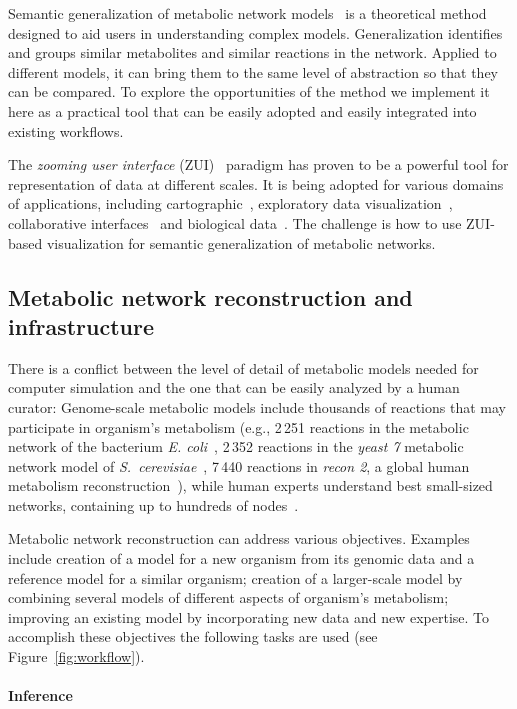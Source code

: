 \documentclass{bmcart}
\begin{document}
Semantic generalization of metabolic network models~\cite{Zhukova2014} is a theoretical method designed to aid users in understanding complex models. Generalization identifies and groups similar metabolites and similar reactions in the network.
Applied to different models, it can bring them to the same level of abstraction so that they can be compared.
To explore the opportunities of the method we implement it here as a practical tool that
can be easily adopted and easily integrated into existing workflows.

The \emph{zooming user interface} (ZUI)~\cite{Bederson1998} paradigm has proven to be a powerful tool for representation of data at different scales. It is being adopted for various domains of applications, including cartographic~\cite{Nivala2008}, exploratory data visualization~\cite{Roberts2005}, collaborative interfaces~\cite{Laufer2011} and biological data~\cite{Pook1998, Hu2007}. The challenge is how to use ZUI-based visualization for semantic generalization of metabolic networks.

\subsection*{Metabolic network reconstruction and infrastructure}
There is a conflict between the level of detail of metabolic models needed for computer simulation and the one that can be easily analyzed by a human curator: Genome-scale metabolic models include thousands of reactions that may participate in organism's metabolism (e.g.,  2\,251 reactions in the metabolic network of the bacterium \emph{E. coli}~\cite{Orth2011}, 2\,352 reactions in the \emph{yeast 7} metabolic network model of \emph{S.~cerevisiae}~\cite{Aung2013}, 7\,440 reactions in \emph{recon 2},  a global human metabolism reconstruction~\cite{Thiele2013}), while human experts understand best small-sized networks, containing up to hundreds of nodes~\cite{VonLandesberger2011,Herman2000}.

Metabolic network reconstruction can address various objectives. Examples include creation of a model for a new organism from its genomic data and a reference model for a similar organism; creation of a larger-scale model by combining several models of different aspects of organism's metabolism; improving an existing model by incorporating new data and new expertise. To accomplish these objectives the following tasks are used (see Figure~\ref{fig:workflow}). 

\paragraph{Inference}
\end{document}
